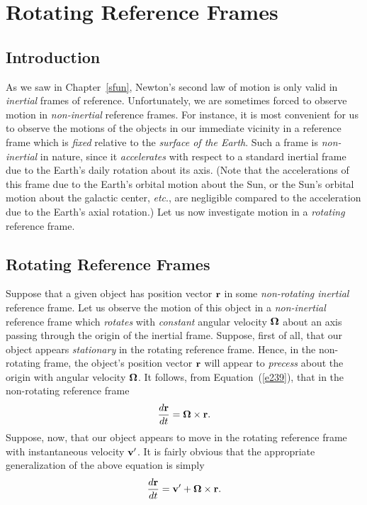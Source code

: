 \chapter{Rotating Reference Frames}\label{snoni}
\section{Introduction}
As we saw in Chapter~\ref{sfun}, Newton's second law of motion is
only valid in {\em inertial}\/ frames of reference. Unfortunately, we are sometimes
forced to observe motion in {\em non-inertial}\/  reference frames. For instance,
it is most convenient for us to observe the motions of the objects in our
immediate vicinity
in a reference frame which is {\em fixed}\/ relative to the {\em surface of the Earth}.
Such a frame is {\em non-inertial}\/ in nature, since it
{\em accelerates}\/ with respect to a standard inertial frame due to the Earth's daily rotation  about
its axis. (Note that the accelerations of this frame due to the Earth's orbital motion about the Sun, or
the Sun's orbital motion about the galactic center, {\em etc}., are
negligible compared to the acceleration due to the Earth's axial rotation.) Let us now investigate
motion in a {\em rotating}\/ reference frame.

\section{Rotating Reference Frames}\label{srot}
Suppose that a given object has position vector ${\bf r}$ in some {\em non-rotating inertial}\/ reference frame. Let us observe the motion of
this object in a {\em non-inertial}\/ reference frame which {\em  rotates}\/ with {\em constant}\/ angular
velocity $\mbox{\boldmath$\Omega$}$ about
an axis passing through the origin of the inertial frame. Suppose, first of all, that our object appears {\em stationary}\/ in the rotating reference frame. Hence, in the non-rotating frame,
the object's  position vector ${\bf r}$ will appear to {\em precess}\/ about the origin with
angular velocity $\mbox{\boldmath$\Omega$}$. It follows, from Equation~(\ref{e239}),
that in the non-rotating reference frame
\begin{equation}
\frac{d{\bf r}}{dt} =  \mbox{\boldmath$\Omega$}\times{\bf r}.
\end{equation}
Suppose, now, that our object appears to move in the rotating reference frame
with instantaneous velocity ${\bf v}'$. It is fairly obvious that the appropriate generalization of the above equation is simply
\begin{equation}
\frac{d{\bf r}}{dt} = {\bf v}'+   \mbox{\boldmath$\Omega$}\times{\bf r}.
\end{equation}

